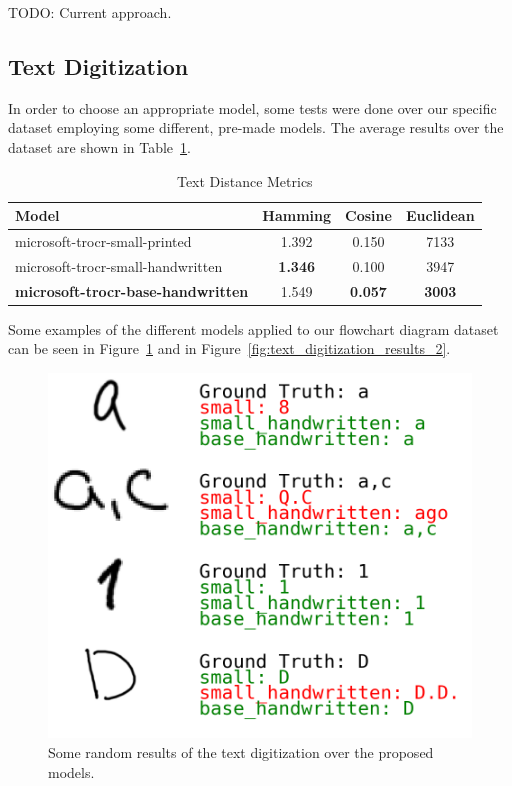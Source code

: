 \documentclass[conference]{IEEEtran}
\begin{document}
TODO: Current approach.

\subsection{Text Digitization}
In order to choose an appropriate model, some tests were done over our specific dataset employing some different, pre-made models. The average results over the dataset are shown in Table~\ref{tab:text_digitization}.

\begin{table}[htbp]
\caption{Text Distance Metrics}
\centering
\begin{tabular}{lccc}
\hline
\textbf{Model} & \textbf{Hamming} & \textbf{Cosine} & \textbf{Euclidean} \\
\hline
microsoft-trocr-small-printed & 1.392 & 0.150 & 7133 \\
microsoft-trocr-small-handwritten & \textbf{1.346} & 0.100  & 3947 \\ 
\hline 
\textbf{microsoft-trocr-base-handwritten} & 1.549 & \textbf{0.057} & \textbf{3003} \\
\hline
\end{tabular}
\label{tab:text_digitization}
\end{table}

Some examples of the different models applied to our flowchart diagram dataset can be seen in Figure~\ref{fig:text_digitization_results_1} and in Figure~\ref{fig:text_digitization_results_2}.

\begin{figure}[H]
\centering
\includegraphics[width=\linewidth]{text_digitization_results_1.png}
\caption{Some random results of the text digitization over the proposed models.}
\label{fig:text_digitization_results_1}
\end{figure}
\end{document}
